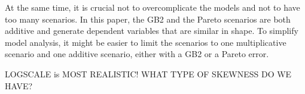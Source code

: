 At the same time, it is crucial not to overcomplicate the models and not to have too many scenarios.
In this paper, the GB2 and the Pareto scenarios are both additive and generate dependent variables that are similar in shape.
To simplify model analysis, it might be easier to limit the scenarios to one multiplicative scenario and one additive scenario, either with a GB2 or a Pareto error.

LOGSCALE is MOST REALISTIC! WHAT TYPE OF SKEWNESS DO WE HAVE?